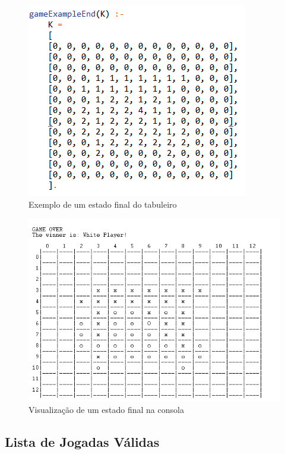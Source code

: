 \documentclass[a4paper]{article}
\begin{document}
\begin{figure}
\begin{center}
\includegraphics[scale=0.8]{gameend.png}
\caption{Exemplo de um estado final do tabuleiro}
\end{center}
\end{figure}

\begin{figure}
\begin{center}
\hspace*{-0.1cm}\includegraphics[scale=0.8]{gameendboard.png}
\caption{Visualização de um estado final na consola}
\end{center}
\end{figure}

\newpage
\subsection{Lista de Jogadas Válidas}
\end{document}
